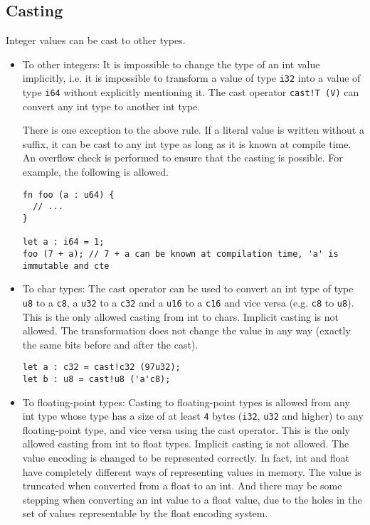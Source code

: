\subsection{Casting}
\label{sec:orgfdc3d25}

Integer values can be cast to other types.

\begin{itemize}
\item To other integers: It is impossible to change the type of an int value
implicitly, i.e. it is impossible to transform a value of type \texttt{i32} into
a value of type \texttt{i64} without explicitly mentioning it. The cast operator
\texttt{cast!T (V)} can convert any int type to another int type.

There is one exception to the above rule. If a literal value is written without
a suffix, it can be cast to any int type as long as it is known at compile time.
An overflow check is performed to ensure that the casting is possible. For
example, the following is allowed.

  \begin{lstlisting}[style=coloredverbatim]
fn foo (a : u64) {
  // ...
}

let a : i64 = 1;
foo (7 + a); // 7 + a can be known at compilation time, 'a' is immutable and cte
  \end{lstlisting}

\item To char types: The cast operator can be used to convert an int type of
  type \texttt{u8} to a \texttt{c8}, a \texttt{u32} to a \texttt{c32} and a
  \texttt{u16} to a \texttt{c16} and vice versa (e.g. \texttt{c8} to
  \texttt{u8}). This is the only allowed casting from int to chars. Implicit
  casting is not allowed. The transformation does not change the value in any
  way (exactly the same bits before and after the cast).

  \begin{lstlisting}[style=coloredverbatim]
let a : c32 = cast!c32 (97u32);
let b : u8 = cast!u8 ('a'c8);
  \end{lstlisting}

\item To floating-point types: Casting to floating-point types is allowed from
  any int type whose type has a size of at least \texttt{4} bytes (\texttt{i32},
  \texttt{u32} and higher) to any floating-point type, and vice versa using the
  cast operator. This is the only allowed casting from int to float types.
  Implicit casting is not allowed. The value encoding is changed to be
  represented correctly. In fact, int and float have completely different ways
  of representing values in memory. The value is truncated when converted from a
  float to an int. And there may be some stepping when converting an int value
  to a float value, due to the holes in the set of values representable by the
  float encoding system.


\end{itemize}
